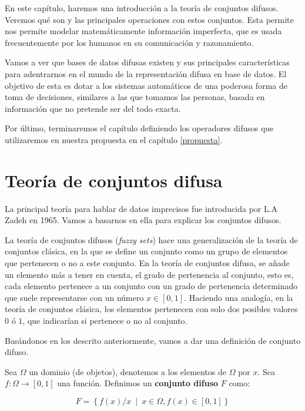\label{chapter:fuzzysets}
En este capítulo, haremos una introducción a la teoría de conjuntos difusos. Veremos qué son y las principales operaciones con estos conjuntos. Esta permite nos permite modelar matemáticamente información imperfecta, que es usada frecuentemente por los humanos en su comunicación y razonamiento.

Vamos a ver que bases de datos difusas existen y sus principales características para adentrarnos en el mundo de la representación difusa en base de datos. El objetivo de esta es dotar a los sistemas automáticos de una poderosa forma de toma de decisiones, similares a las que tomamos las personas, basada en información que no pretende ser del todo exacta.

Por último, terminaremos el capítulo definiendo los operadores difusos que utilizaremos en nuestra propuesta en el capítulo \ref{propuesta}.

\section{Teoría de conjuntos difusa}

La principal teoría para hablar de datos imprecisos fue introducida por L.A Zadeh \cite{fuzzysetszadeh} en 1965. Vamos a basarnos en ella para explicar los conjuntos difusos.

La teoría de conjuntos difusos (\textit{fuzzy sets}) hace una generalización de la teoría de conjuntos clásica, en la que se define un conjunto como un grupo de elementos que pertenecen o no a este conjunto. En la teoría de conjuntos difusa, se añade un elemento más a tener en cuenta, el grado de pertenencia al conjunto, esto es, cada elemento pertenece a un conjunto con un grado de pertenencia determinado que suele representarse con un número $x \in [0,1]$. Haciendo una analogía, en la teoría de conjuntos clásica, los elementos pertenecen con solo dos posibles valores $0$ ó $1$, que indicarían si pertenece o no al conjunto.

Basándonos en los descrito anteriormente, vamos a dar una definición de conjunto difuso.

\begin{definition}
Sea $\Omega$ un dominio (de objetos), denotemos a los elementos de $\Omega$ por $x$. Sea $f: \Omega \longrightarrow [0,1]$ una función. Definimos un \textbf{conjunto difuso} $F$ como:

\begin{equation*}
    F = \left\{ f(x)/x \enspace | \enspace x\in\Omega, f(x) \in [0,1] \right\}
\end{equation*}
\end{definition}

